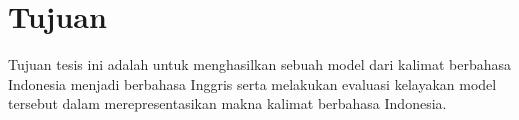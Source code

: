 \section{Tujuan}

Tujuan tesis ini adalah untuk menghasilkan sebuah model \crosslingual{} \amrparsing{} dari kalimat berbahasa Indonesia menjadi \AMR{} berbahasa Inggris serta melakukan evaluasi kelayakan model tersebut dalam merepresentasikan makna kalimat berbahasa Indonesia.
